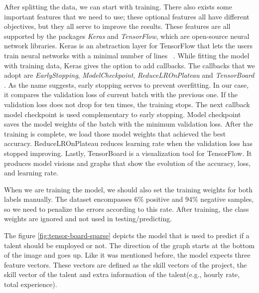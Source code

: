After splitting the data, we can start with training. There also exists some important features that we need to use; these optional features all have different objectives, but they all serve to improve the results. These features are all supported by the packages \textit{Keras} and \textit{TensorFlow}, which are open-source neural network libraries. Keras is an abstraction layer for TensorFlow that lets the users train neural networks with a minimal number of lines ~\parencite{chollet2018deep}. While fitting the model with training data, Keras gives the option to add callbacks. The callbacks that we adopt are \textit{EarlyStopping}, \textit{ModelCheckpoint},  \textit{ReduceLROnPlateau} and \textit{TensorBoard} . As the name suggests, early stopping serves to prevent overfitting. In our case, it compares the validation loss of current batch with the previous one. If the validation loss does not drop for ten times, the training stops. The next callback model checkpoint is used complementary to early stopping. Model checkpoint saves the model weights of the batch with the minimum validation loss. After the training is complete, we load those model weights that achieved the best accuracy. ReduceLROnPlateau reduces learning rate when the validation loss has stopped improving. Lastly, TensorBoard is a visualization tool for TensorFlow. It produces model visions and graphs that show the evolution of the accuracy, loss, and learning rate. 

When we are training the model, we should also set the training weights for both labels manually. The dataset encompasses 6\% positive and 94\% negative samples, so we need to penalize the errors according to this rate. After training, the class weights are ignored and not used in testing/predicting.


The figure \ref{fig:tensor-board-sparse}  depicts the model that is used to predict if a talent should be employed or not. The direction of the graph starts at the bottom of the image and goes up. Like it was mentioned before, the model expects three feature vectors. These vectors are defined as the skill vectors of the project, the skill vector of the talent and extra information of the talent(e.g., hourly rate, total experience). 

